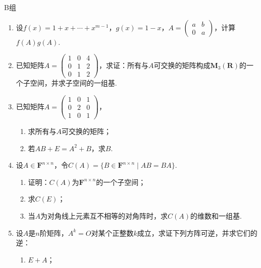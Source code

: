 \centerline{\heiti B组}
\begin{enumerate}
    \item 设$f(x)=1+x+\cdots+x^{m-1}$，$g(x)=1-x$，$A=\begin{pmatrix}
                  a & b \\ 0 & a
              \end{pmatrix}$，计算$f(A)g(A)$.

    \item 已知矩阵$A=\begin{pmatrix}
                  1 & 0 & 4 \\ 0 & 1 & 2 \\ 0 & 1 & 2
              \end{pmatrix}$，求证：所有与$A$可交换的矩阵构成$\mathbf{M}_3(\mathbf{R})$的一个子空间，并求子空间的一组基.

    \item 已知矩阵$A=\begin{pmatrix}
                  1 & 0 & 1 \\ 0 & 2 & 0 \\ 1 & 0 & 1
              \end{pmatrix}$，
          \begin{enumerate}
              \item 求所有与$A$可交换的矩阵；

              \item 若$AB+E=A^2+B$，求$B$.
          \end{enumerate}

    \item 设$A \in \mathbf{F}^{n \times n}$，令$C(A)=\{B \in \mathbf{F}^{n \times n} \mid AB=BA\}$.
          \begin{enumerate}
              \item 证明：$C(A)$为$\mathbf{F}^{n \times n}$的一个子空间；

              \item 求$C(E)$；

              \item 当$A$为对角线上元素互不相等的对角阵时，求$C(A)$的维数和一组基.
          \end{enumerate}

    \item 设$A$是$n$阶矩阵，$A^k=O$对某个正整数$k$成立，求证下列方阵可逆，并求它们的逆：
          \begin{enumerate}
              \item $E+A$；


\end{enumerate}
\end{enumerate}
